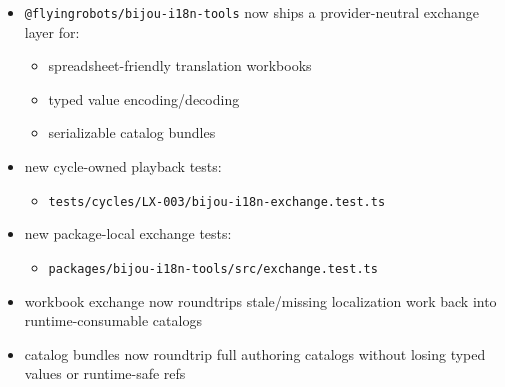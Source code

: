 \begin{itemize}
\tightlist
\item
  \texttt{@\allowbreak{}f\allowbreak{}l\allowbreak{}y\allowbreak{}i\allowbreak{}n\allowbreak{}g\allowbreak{}r\allowbreak{}o\allowbreak{}b\allowbreak{}o\allowbreak{}t\allowbreak{}s\allowbreak{}/\allowbreak{}b\allowbreak{}i\allowbreak{}j\allowbreak{}o\allowbreak{}u\allowbreak{}-\allowbreak{}i\allowbreak{}1\allowbreak{}8\allowbreak{}n\allowbreak{}-\allowbreak{}t\allowbreak{}o\allowbreak{}o\allowbreak{}l\allowbreak{}s} now ships a provider-neutral exchange layer for:

  \begin{itemize}
  \tightlist
  \item
    spreadsheet-friendly translation workbooks
  \item
    typed value encoding/decoding
  \item
    serializable catalog bundles
  \end{itemize}
\item
  new cycle-owned playback tests:

  \begin{itemize}
  \tightlist
  \item
    \texttt{t\allowbreak{}e\allowbreak{}s\allowbreak{}t\allowbreak{}s\allowbreak{}/\allowbreak{}c\allowbreak{}y\allowbreak{}c\allowbreak{}l\allowbreak{}e\allowbreak{}s\allowbreak{}/\allowbreak{}L\allowbreak{}X\allowbreak{}-\allowbreak{}0\allowbreak{}0\allowbreak{}3\allowbreak{}/\allowbreak{}b\allowbreak{}i\allowbreak{}j\allowbreak{}o\allowbreak{}u\allowbreak{}-\allowbreak{}i\allowbreak{}1\allowbreak{}8\allowbreak{}n\allowbreak{}-\allowbreak{}e\allowbreak{}x\allowbreak{}c\allowbreak{}h\allowbreak{}a\allowbreak{}n\allowbreak{}g\allowbreak{}e\allowbreak{}.\allowbreak{}t\allowbreak{}e\allowbreak{}s\allowbreak{}t\allowbreak{}.\allowbreak{}t\allowbreak{}s}
  \end{itemize}
\item
  new package-local exchange tests:

  \begin{itemize}
  \tightlist
  \item
    \texttt{p\allowbreak{}a\allowbreak{}c\allowbreak{}k\allowbreak{}a\allowbreak{}g\allowbreak{}e\allowbreak{}s\allowbreak{}/\allowbreak{}b\allowbreak{}i\allowbreak{}j\allowbreak{}o\allowbreak{}u\allowbreak{}-\allowbreak{}i\allowbreak{}1\allowbreak{}8\allowbreak{}n\allowbreak{}-\allowbreak{}t\allowbreak{}o\allowbreak{}o\allowbreak{}l\allowbreak{}s\allowbreak{}/\allowbreak{}s\allowbreak{}r\allowbreak{}c\allowbreak{}/\allowbreak{}e\allowbreak{}x\allowbreak{}c\allowbreak{}h\allowbreak{}a\allowbreak{}n\allowbreak{}g\allowbreak{}e\allowbreak{}.\allowbreak{}t\allowbreak{}e\allowbreak{}s\allowbreak{}t\allowbreak{}.\allowbreak{}t\allowbreak{}s}
  \end{itemize}
\item
  workbook exchange now roundtrips stale/missing localization work back into runtime-consumable catalogs
\item
  catalog bundles now roundtrip full authoring catalogs without losing typed values or runtime-safe refs
\end{itemize}

